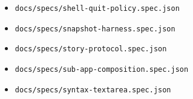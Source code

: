 \begin{itemize}
\item
  \texttt{d\allowbreak{}o\allowbreak{}c\allowbreak{}s\allowbreak{}/\allowbreak{}s\allowbreak{}p\allowbreak{}e\allowbreak{}c\allowbreak{}s\allowbreak{}/\allowbreak{}s\allowbreak{}h\allowbreak{}e\allowbreak{}l\allowbreak{}l\allowbreak{}-\allowbreak{}q\allowbreak{}u\allowbreak{}i\allowbreak{}t\allowbreak{}-\allowbreak{}p\allowbreak{}o\allowbreak{}l\allowbreak{}i\allowbreak{}c\allowbreak{}y\allowbreak{}.\allowbreak{}s\allowbreak{}p\allowbreak{}e\allowbreak{}c\allowbreak{}.\allowbreak{}j\allowbreak{}s\allowbreak{}o\allowbreak{}n}
\item
  \texttt{d\allowbreak{}o\allowbreak{}c\allowbreak{}s\allowbreak{}/\allowbreak{}s\allowbreak{}p\allowbreak{}e\allowbreak{}c\allowbreak{}s\allowbreak{}/\allowbreak{}s\allowbreak{}n\allowbreak{}a\allowbreak{}p\allowbreak{}s\allowbreak{}h\allowbreak{}o\allowbreak{}t\allowbreak{}-\allowbreak{}h\allowbreak{}a\allowbreak{}r\allowbreak{}n\allowbreak{}e\allowbreak{}s\allowbreak{}s\allowbreak{}.\allowbreak{}s\allowbreak{}p\allowbreak{}e\allowbreak{}c\allowbreak{}.\allowbreak{}j\allowbreak{}s\allowbreak{}o\allowbreak{}n}
\item
  \texttt{d\allowbreak{}o\allowbreak{}c\allowbreak{}s\allowbreak{}/\allowbreak{}s\allowbreak{}p\allowbreak{}e\allowbreak{}c\allowbreak{}s\allowbreak{}/\allowbreak{}s\allowbreak{}t\allowbreak{}o\allowbreak{}r\allowbreak{}y\allowbreak{}-\allowbreak{}p\allowbreak{}r\allowbreak{}o\allowbreak{}t\allowbreak{}o\allowbreak{}c\allowbreak{}o\allowbreak{}l\allowbreak{}.\allowbreak{}s\allowbreak{}p\allowbreak{}e\allowbreak{}c\allowbreak{}.\allowbreak{}j\allowbreak{}s\allowbreak{}o\allowbreak{}n}
\item
  \texttt{d\allowbreak{}o\allowbreak{}c\allowbreak{}s\allowbreak{}/\allowbreak{}s\allowbreak{}p\allowbreak{}e\allowbreak{}c\allowbreak{}s\allowbreak{}/\allowbreak{}s\allowbreak{}u\allowbreak{}b\allowbreak{}-\allowbreak{}a\allowbreak{}p\allowbreak{}p\allowbreak{}-\allowbreak{}c\allowbreak{}o\allowbreak{}m\allowbreak{}p\allowbreak{}o\allowbreak{}s\allowbreak{}i\allowbreak{}t\allowbreak{}i\allowbreak{}o\allowbreak{}n\allowbreak{}.\allowbreak{}s\allowbreak{}p\allowbreak{}e\allowbreak{}c\allowbreak{}.\allowbreak{}j\allowbreak{}s\allowbreak{}o\allowbreak{}n}
\item
  \texttt{d\allowbreak{}o\allowbreak{}c\allowbreak{}s\allowbreak{}/\allowbreak{}s\allowbreak{}p\allowbreak{}e\allowbreak{}c\allowbreak{}s\allowbreak{}/\allowbreak{}s\allowbreak{}y\allowbreak{}n\allowbreak{}t\allowbreak{}a\allowbreak{}x\allowbreak{}-\allowbreak{}t\allowbreak{}e\allowbreak{}x\allowbreak{}t\allowbreak{}a\allowbreak{}r\allowbreak{}e\allowbreak{}a\allowbreak{}.\allowbreak{}s\allowbreak{}p\allowbreak{}e\allowbreak{}c\allowbreak{}.\allowbreak{}j\allowbreak{}s\allowbreak{}o\allowbreak{}n}

\end{itemize}
